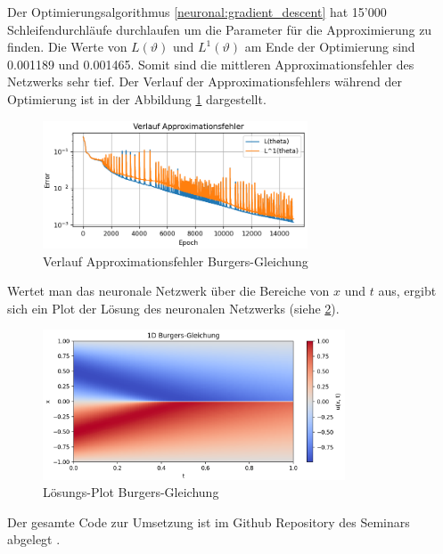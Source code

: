 Der Optimierungsalgorithmus \ref{neuronal:gradient_descent} hat 15'000 Schleifendurchläufe durchlaufen um die Parameter für die Approximierung zu finden.
Die Werte von $L(\vartheta)$ und $L^1(\vartheta)$ am Ende der Optimierung sind 0.001189 und 0.001465.
Somit sind die mittleren Approximationsfehler des Netzwerks sehr tief.
Der Verlauf der Approximationsfehlers während der Optimierung ist in der Abbildung \ref{fig:fehler_burgers} dargestellt.

\begin{figure}
    \centering
    \hspace*{-0.1\textwidth}
    \includegraphics[width=0.7\textwidth]{papers/neuronal/images/approximation_error_burgers.png}
    \caption{Verlauf Approximationsfehler Burgers-Gleichung}
    \label{fig:fehler_burgers}
\end{figure}

Wertet man das neuronale Netzwerk über die Bereiche von $x$ und $t$ aus, ergibt sich ein Plot der Lösung des neuronalen Netzwerks (siehe \ref{fig:loesung_burgers}).

\begin{figure}
    \centering
    \includegraphics[width=0.8\textwidth]{papers/neuronal/images/prediction_burgers_net.png}
    \caption{Lösungs-Plot Burgers-Gleichung}
    \label{fig:loesung_burgers}
\end{figure}

Der gesamte Code zur Umsetzung ist im Github Repository des Seminars abgelegt \cite{neuronal:github_source_code}.
